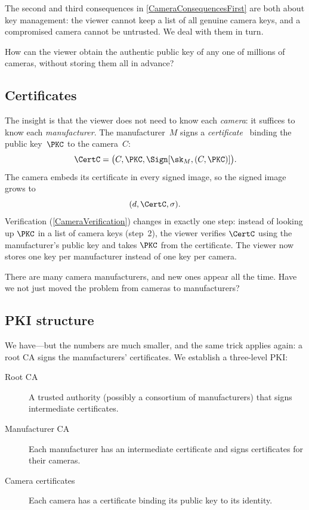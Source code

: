 The second and third consequences in \cref{CameraConsequencesFirst} are
both about key management: the viewer cannot keep a list of all genuine
camera keys, and a compromised camera cannot be untrusted.
We deal with them in turn.

\begin{exercise}
  How can the viewer obtain the authentic public key of any one of
  millions of cameras, without storing them all in advance?
\end{exercise}

\subsection{Certificates}

The insight is that the viewer does not need to know each \emph{camera}:
it suffices to know each \emph{manufacturer}.
The manufacturer~\(M\) signs a \emph{certificate}~\autocite{Kohnfelder1978}
binding the public key~\(\PKC\) to the camera~\(C\):
\[
  \CertC = \bigl(C, \PKC, \Sign[\sk_M, (C, \PKC)]\bigr).
\]
The camera embeds its certificate in every signed image, so the signed
image grows to
\[
  (d, \CertC, \sigma).
\]
Verification (\cref{CameraVerification}) changes in exactly one step:
instead of looking up \(\PKC\) in a list of camera keys (step~2), the
viewer verifies \(\CertC\) using the manufacturer's public key and takes
\(\PKC\) from the certificate.
The viewer now stores one key per manufacturer instead of one key per
camera.

\begin{exercise}
  There are many camera manufacturers, and new ones appear all the time.
  Have we not just moved the problem from cameras to manufacturers?
\end{exercise}

\subsection{PKI structure}

We have---but the numbers are much smaller, and the same trick applies
again: a root \ac{CA} signs the manufacturers' certificates.
We establish a three-level \ac{PKI}:
\begin{description}
  \item[Root CA] A trusted authority (possibly a consortium of
    manufacturers) that signs intermediate certificates.
  \item[Manufacturer CA] Each manufacturer has an intermediate certificate
    and signs certificates for their cameras.
  \item[Camera certificates] Each camera has a certificate binding its
    public key to its identity.
\end{description}

